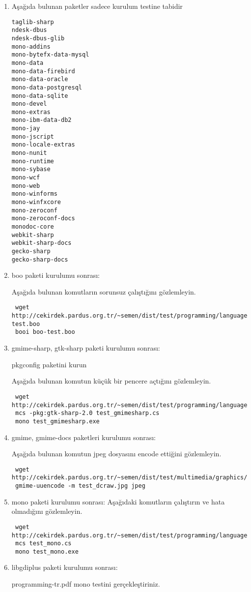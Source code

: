\documentclass[a4paper,10pt]{article}
\begin{document}
\begin{enumerate}

\item Aşağıda bulunan paketler sadece kurulum testine tabidir
\begin{verbatim}
taglib-sharp
ndesk-dbus
ndesk-dbus-glib
mono-addins
mono-bytefx-data-mysql
mono-data
mono-data-firebird
mono-data-oracle
mono-data-postgresql
mono-data-sqlite
mono-devel
mono-extras
mono-ibm-data-db2
mono-jay
mono-jscript
mono-locale-extras
mono-nunit
mono-runtime
mono-sybase
mono-wcf
mono-web
mono-winforms
mono-winfxcore
mono-zeroconf
mono-zeroconf-docs
monodoc-core
webkit-sharp
webkit-sharp-docs
gecko-sharp
gecko-sharp-docs
\end{verbatim}

\item boo paketi kurulumu sonrası:

Aşağıda bulunan komutların sorunsuz çalıştığını gözlemleyin.
\begin{verbatim}
 wget http://cekirdek.pardus.org.tr/~semen/dist/test/programming/language/dotnet/boo-test.boo
 booi boo-test.boo
\end{verbatim}
 \item gmime-sharp, gtk-sharp paketi kurulumu sonrası:

pkgconfig paketini kurun

Aşağıda bulunan komutun küçük bir pencere açtığını gözlemleyin. 
\begin{verbatim}
 wget http://cekirdek.pardus.org.tr/~semen/dist/test/programming/language/dotnet/test_gmimesharp.cs
 mcs -pkg:gtk-sharp-2.0 test_gmimesharp.cs
 mono test_gmimesharp.exe
\end{verbatim}


 \item gmime, gmime-docs paketleri kurulumu sonrası:

Aşağıda bulunan komutun jpeg dosyasını encode ettiğini gözlemleyin.
\begin{verbatim}
 wget http://cekirdek.pardus.org.tr/~semen/dist/test/multimedia/graphics/test_dcraw.jpg
 gmime-uuencode -m test_dcraw.jpg jpeg
\end{verbatim}


 \item mono paketi kurulumu sonrası:
Aşağıdaki komutların çalıştırın ve hata olmadığını gözlemleyin.
\begin{verbatim}
 wget http://cekirdek.pardus.org.tr/~semen/dist/test/programming/language/dotnet/test_mono.cs
 mcs test_mono.cs
 mono test_mono.exe
\end{verbatim}

\item libgdiplus paketi kurulumu sonrası:

programming-tr.pdf mono testini gerçekleştiriniz.

\end{enumerate}
\end{document}
